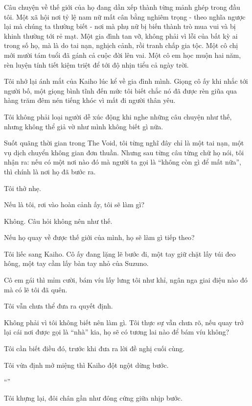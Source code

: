 \documentclass[../main.tex]{subfiles}
\begin{document}
Câu chuyện về thế giới của họ đang dần xếp thành từng mảnh ghép trong đầu tôi. Một xã hội nơi tỷ lệ nam nữ mất cân bằng nghiêm trọng - theo nghĩa ngược lại mà chúng ta thường biết - nơi mà phụ nữ bị biến thành trò mua vui và bị khinh thường tới rẻ mạt. Một gia đình tan vỡ, không phải vì lỗi của bất kỳ ai trong số họ, mà là do tai nạn, nghịch cảnh, rồi tranh chấp gia tộc. Một cô chị mới mười tám tuổi đã gánh cả cuộc đời lên vai. Một cô em học muộn hai năm, rèn luyện tính tiết kiệm triệt để tới độ nhịn tiểu cả ngày trời.

Tôi nhớ lại ánh mắt của Kaiho lúc kể về gia đình mình. Giọng cô ấy khi nhắc tới người bố, một giọng bình tĩnh đến mức tôi biết chắc nó đã được rèn giũa qua hàng trăm đêm nén tiếng khóc vì mất đi người thân yêu.

Tôi không phải loại người dễ xúc động khi nghe những câu chuyện như thế, nhưng không thể giả vờ như mình không biết gì nữa.

Suốt quãng thời gian trong The Void, tôi từng nghĩ đây chỉ là một tai nạn, một vụ dịch chuyển không gian đơn thuần. Nhưng sau từng câu từng chữ họ nói, tôi nhận ra: nếu có một nơi nào đó mà người ta gọi là ``không còn gì để mất nữa'', thì chính là nơi họ đã bước ra.

Tôi thở nhẹ.

Nếu là tôi, rơi vào hoàn cảnh ấy, tôi sẽ làm gì?

Không. Câu hỏi không nên như thế.

Nếu họ quay về được thế giới của mình, họ sẽ làm gì tiếp theo?

Tôi liếc sang Kaiho. Cô ấy đang lặng lẽ bước đi, một tay giữ chặt lấy túi đeo hông, một tay cầm lấy bàn tay nhỏ của Suzuno.

Cô em gái thì mỉm cười, bám víu lấy lưng tôi như khỉ, ngân nga giai điệu nào đó mà có lẽ tôi đã quên.

Tôi vẫn chưa thể đưa ra quyết định.

Không phải vì tôi không biết nên làm gì. Tôi thực sự vẫn chưa rõ, nếu quay trở lại cái nơi được gọi là ``nhà'' kia, họ sẽ có tương lai nào để bám víu không?

Tôi cần biết điều đó, trước khi đưa ra lời đề nghị cuối cùng.

Tôi vừa định mở miệng thì Kaiho đột ngột dừng bước.

``''

Tôi khựng lại, đôi chân gần như đông cứng giữa nhịp bước.
\end{document}
